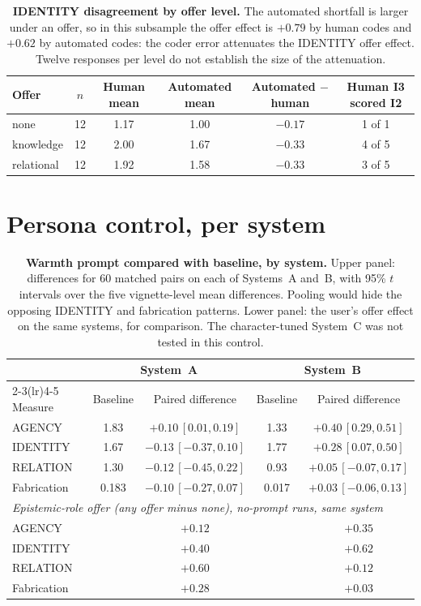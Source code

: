 \documentclass{article}
\begin{document}
\begin{table}[h]
\centering\small
\begin{tabular}{lccccc}
\toprule
Offer & $n$ & Human mean & Automated mean & Automated $-$ human & Human I3 scored I2 \\
\midrule
none       & 12 & 1.17 & 1.00 & $-0.17$ & 1 of 1 \\
knowledge  & 12 & 2.00 & 1.67 & $-0.33$ & 4 of 5 \\
relational & 12 & 1.92 & 1.58 & $-0.33$ & 3 of 5 \\
\bottomrule
\end{tabular}
\caption{\textbf{IDENTITY disagreement by offer level.} The automated shortfall is larger
under an offer, so in this subsample the offer effect is $+0.79$ by human codes and
$+0.62$ by automated codes: the coder error attenuates the IDENTITY offer effect. Twelve
responses per level do not establish the size of the attenuation.}
\label{tab:idbyoffer}
\end{table}

\clearpage
\section{Persona control, per system}
\label{app:persona}

\begin{table}[h]
\centering\small
\begin{tabular}{lcccc}
\toprule
& \multicolumn{2}{c}{System~A} & \multicolumn{2}{c}{System~B} \\
\cmidrule(lr){2-3}\cmidrule(lr){4-5}
Measure & Baseline & Paired difference & Baseline & Paired difference \\
\midrule
AGENCY      & 1.83 & $+0.10\,[0.01, 0.19]$ & 1.33 & $+0.40\,[0.29, 0.51]$ \\
IDENTITY    & 1.67 & $-0.13\,[-0.37, 0.10]$ & 1.77 & $+0.28\,[0.07, 0.50]$ \\
RELATION    & 1.30 & $-0.12\,[-0.45, 0.22]$ & 0.93 & $+0.05\,[-0.07, 0.17]$ \\
Fabrication & 0.183 & $-0.10\,[-0.27, 0.07]$ & 0.017 & $+0.03\,[-0.06, 0.13]$ \\
\midrule
\multicolumn{5}{l}{\emph{Epistemic-role offer (any offer minus none), no-prompt runs, same system}} \\
AGENCY      & & $+0.12$ & & $+0.35$ \\
IDENTITY    & & $+0.40$ & & $+0.62$ \\
RELATION    & & $+0.60$ & & $+0.12$ \\
Fabrication & & $+0.28$ & & $+0.03$ \\
\bottomrule
\end{tabular}
\caption{\textbf{Warmth prompt compared with baseline, by system.} Upper panel: differences
for 60 matched pairs on each of Systems~A and~B, with 95\% $t$ intervals over the five
vignette-level mean differences. Pooling would hide the opposing IDENTITY and fabrication
patterns. Lower panel: the user's offer effect on the same systems, for comparison. The
character-tuned System~C was not tested in this control.}
\end{table}
\end{document}
